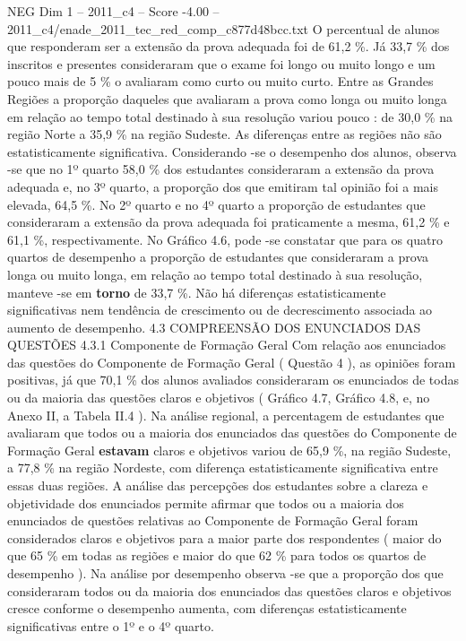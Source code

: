 \begin{textsample}{NEG Dim 1 – 2011\_c4 – Score -4.00 – 2011\_c4/enade\_2011\_tec\_red\_comp\_c877d48bcc.txt}
O percentual de alunos que responderam ser a extensão da prova adequada foi de 61,2 \%.
Já 33,7 \% dos inscritos e presentes consideraram que o exame foi longo ou muito longo e um pouco mais de 5 \% o avaliaram como curto ou muito curto.
Entre as Grandes Regiões a proporção daqueles que avaliaram a prova como longa ou muito longa em relação ao tempo total destinado à sua resolução variou pouco : de 30,0 \% na região Norte a 35,9 \% na região Sudeste.
As diferenças entre as regiões não são estatisticamente significativa.
Considerando -se o desempenho dos alunos, observa -se que no 1º quarto 58,0 \% dos estudantes consideraram a extensão da prova adequada e, no 3º quarto, a proporção dos que emitiram tal opinião foi a mais elevada, 64,5 \%.
No 2º quarto e no 4º quarto a proporção de estudantes que consideraram a extensão da prova adequada foi praticamente a mesma, 61,2 \% e 61,1 \%, respectivamente.
No Gráfico 4.6, pode -se constatar que para os quatro quartos de desempenho a proporção de estudantes que consideraram a prova longa ou muito longa, em relação ao tempo total destinado à sua resolução, manteve -se em \textbf{torno} de 33,7 \%.
Não há diferenças estatisticamente significativas nem tendência de crescimento ou de decrescimento associada ao aumento de desempenho. 4.3 COMPREENSÃO DOS ENUNCIADOS DAS QUESTÕES 4.3.1 Componente de Formação Geral Com relação aos enunciados das questões do Componente de Formação Geral ( Questão 4 ), as opiniões foram positivas, já que 70,1 \% dos alunos avaliados consideraram os enunciados de todas ou da maioria das questões claros e objetivos ( Gráfico 4.7, Gráfico 4.8, e, no Anexo II, a Tabela II.4 ).
Na análise regional, a percentagem de estudantes que avaliaram que todos ou a maioria dos enunciados das questões do Componente de Formação Geral \textbf{estavam} claros e objetivos variou de 65,9 \%, na região Sudeste, a 77,8 \% na região Nordeste, com diferença estatisticamente significativa entre essas duas regiões.
A análise das percepções dos estudantes sobre a clareza e objetividade dos enunciados permite afirmar que todos ou a maioria dos enunciados de questões relativas ao Componente de Formação Geral foram considerados claros e objetivos para a maior parte dos respondentes ( maior do que 65 \% em todas as regiões e maior do que 62 \% para todos os quartos de desempenho ).
Na análise por desempenho observa -se que a proporção dos que consideraram todos ou da maioria dos enunciados das questões claros e objetivos cresce conforme o desempenho aumenta, com diferenças estatisticamente significativas entre o 1º e o 4º quarto.

\end{textsample}
